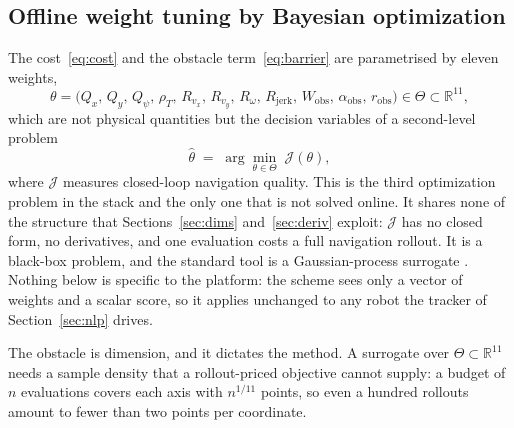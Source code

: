 \documentclass[11pt,a4paper]{article}
\newcommand{\R}{\mathbb{R}}
\newcommand{\Wobs}{W_{\mathrm{obs}}}
\newcommand{\aobs}{\alpha_{\mathrm{obs}}}
\newcommand{\robs}{r_{\mathrm{obs}}}
\newcommand{\Rjerk}{R_{\mathrm{jerk}}}
\begin{document}
\subsection{Offline weight tuning by Bayesian optimization}
\label{sec:bo}

The cost~\eqref{eq:cost} and the obstacle term~\eqref{eq:barrier} are parametrised by eleven weights,
\begin{equation}
  \theta=\big(Q_x,\,Q_y,\,Q_\psi,\,\rho_T,\,R_{v_x},\,R_{v_y},\,R_\omega,\,\Rjerk,\,\Wobs,\,\aobs,\,\robs\big)
  \in\Theta\subset\R^{11},
  \label{eq:theta}
\end{equation}
which are not physical quantities but the decision variables of a second-level problem
\begin{equation}
  \hat\theta \;=\; \arg\min_{\theta\in\Theta}\;\mathcal{J}(\theta),
  \label{eq:outer}
\end{equation}
where $\mathcal{J}$ measures closed-loop navigation quality. This is the third optimization problem in the
stack and the only one that is not solved online. It shares none of the structure that
Sections~\ref{sec:dims} and~\ref{sec:deriv} exploit: $\mathcal{J}$ has no closed form, no derivatives, and
one evaluation costs a full navigation rollout. It is a black-box problem, and the standard tool is a
Gaussian-process surrogate \cite{rasmussen2006gp,shahriari2016bo}. Nothing below is specific to the platform:
the scheme sees only a vector of weights and a scalar score, so it applies unchanged to any robot the
tracker of Section~\ref{sec:nlp} drives.

The obstacle is dimension, and it dictates the method. A surrogate over $\Theta\subset\R^{11}$ needs a sample
density that a rollout-priced objective cannot supply: a budget of $n$ evaluations covers each axis with
$n^{1/11}$ points, so even a hundred rollouts amount to fewer than two points per coordinate.
\end{document}
